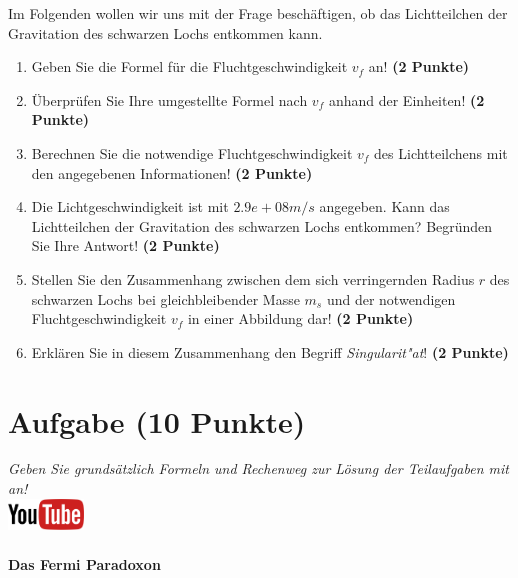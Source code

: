 \documentclass[a4paper, 10pt]{scrartcl}\usepackage[]{graphicx}\usepackage[]{xcolor}
\begin{document}
Im Folgenden wollen wir uns mit der Frage besch{\"a}ftigen, ob das
Lichtteilchen der Gravitation des schwarzen Lochs entkommen kann.

\begin{enumerate}
\item Geben Sie die Formel f{\"u}r die Fluchtgeschwindigkeit $v_f$ an! 
  \textbf{(2 Punkte)}
\item {\"U}berpr{\"u}fen Sie Ihre umgestellte Formel nach $v_f$ anhand der Einheiten!
  \textbf{(2 Punkte)} 
\item Berechnen Sie die notwendige Fluchtgeschwindigkeit $v_f$ des
  Lichtteilchens mit den angegebenen Informationen! \textbf{(2 Punkte)}
\item Die Lichtgeschwindigkeit ist mit $2.9e+08m/s$ angegeben. Kann das
  Lichtteilchen der Gravitation des schwarzen Lochs entkommen? Begr{\"u}nden
  Sie Ihre Antwort! \textbf{(2 Punkte)}
\item Stellen Sie den Zusammenhang zwischen dem sich verringernden Radius
  $r$ des schwarzen Lochs bei gleichbleibender Masse $m_s$
  und der notwendigen Fluchtgeschwindigkeit $v_f$ in einer Abbildung dar!
  \textbf{(2 Punkte)}
\item Erkl{\"a}ren Sie in diesem Zusammenhang den Begriff
  \textit{Singularit{"a}t}! \textbf{(2 Punkte)} 
\end{enumerate}


\clearpage\null 
\clearpage

\section{Aufgabe \hfill (10 Punkte)}

\textit{Geben Sie grunds{\"a}tzlich Formeln und Rechenweg zur L{\"o}sung der
  Teilaufgaben mit an!} \\[1Ex]

\hfill\href{https://youtu.be/-b4IRu2-EJo}{\includegraphics[width =
  2cm]{img/youtube}} %
\hspace{2Ex}

\paragraph{Das Fermi Paradoxon}
\end{document}
